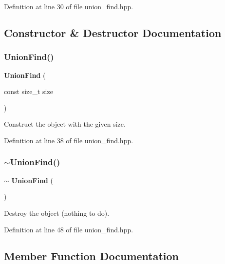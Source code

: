 Definition at line 30 of file union\+\_\+find.\+hpp.



\subsection{Constructor \& Destructor Documentation}
\mbox{\label{classmlpack_1_1emst_1_1UnionFind_a9b34dcd36c63b66adfdf6ec2a7048c4c}} 
\subsubsection{Union\+Find()}
{\footnotesize\ttfamily \textbf{ Union\+Find} (\begin{DoxyParamCaption}\item[{const size\+\_\+t}]{size }\end{DoxyParamCaption})\hspace{0.3cm}{\ttfamily [inline]}}



Construct the object with the given size. 



Definition at line 38 of file union\+\_\+find.\+hpp.

\mbox{\label{classmlpack_1_1emst_1_1UnionFind_ad03a80f5b30db459101cdb7371cb52c4}} 
\subsubsection{$\sim$\+Union\+Find()}
{\footnotesize\ttfamily $\sim$\textbf{ Union\+Find} (\begin{DoxyParamCaption}{ }\end{DoxyParamCaption})\hspace{0.3cm}{\ttfamily [inline]}}



Destroy the object (nothing to do). 



Definition at line 48 of file union\+\_\+find.\+hpp.



\subsection{Member Function Documentation}
\mbox{\label{classmlpack_1_1emst_1_1UnionFind_a16caadf3734b274989d7610aa480808d}} 
